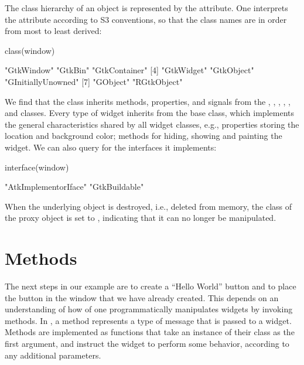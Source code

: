 The class hierarchy of an object is represented by the
 attribute. One interprets the attribute according to S3
conventions, so that the class names are in order from most to least
derived:
\begin{Schunk}
\begin{Sinput}
 class(window)
\end{Sinput}
\end{Schunk}
\begin{Soutput}
[1] "GtkWindow"   "GtkBin"      "GtkContainer"     
[4] "GtkWidget"   "GtkObject"   "GInitiallyUnowned"
[7] "GObject"     "RGtkObject" 
\end{Soutput}
%
We find that the  class inherits methods,
properties, and signals from the , ,
, , , and
 classes. Every type of \GTK\/ widget inherits from
the base  class, which implements the general
characteristics shared by all widget classes, e.g., properties storing
the location and background color; methods for hiding, showing and
painting the widget. We can also query  for the
interfaces it implements:
\begin{Schunk}
\begin{Sinput}
 interface(window)
\end{Sinput}
\begin{Soutput}
[1] "AtkImplementorIface" "GtkBuildable"       
\end{Soutput}
\end{Schunk}

When the underlying \GTK\/ object is destroyed, i.e., deleted
from memory, the class of the proxy object is set to ,
indicating that it can no longer be manipulated.

\section{Methods}

The next steps in our example are to create a ``Hello World'' button
and to place the button in the window that we have already
created. This depends on an understanding of how of one
programmatically manipulates widgets by invoking methods.  In
, a method represents a type of message that is passed to a
widget. Methods are implemented as functions that take an instance of
their class as the first argument, and instruct the widget to perform
some behavior, according to any additional parameters.

